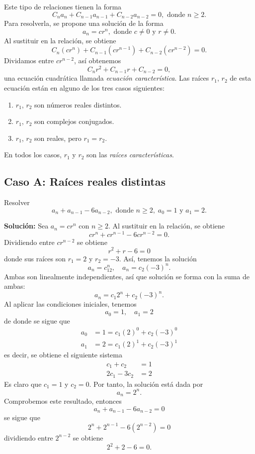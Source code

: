 Este tipo de relaciones tienen la forma
$$C_n a_n + C_{n-1} a_{n-1} + C_{n-2} a_{n-2} = 0, \text{ donde } n \geq 2.$$
Para resolverla, se propone una solución de la forma
$$a_n = cr^{n}, \text{ donde } c \neq 0 \text{ y } r \neq 0.$$
Al sustituir en la relación, se obtiene
$$C_n(cr^{n}) + C_{n-1} (cr^{n-1}) + C_{n-2} (cr^{n-2}) = 0.$$
Dividamos entre $cr^{n-2}$, así obtenemos
$$C_n r^{2} + C_{n-1} r + C_{n-2} = 0,$$
una ecuación cuadrática llamada \textit{ecuación característica}. Las raíces $r_1$, $r_2$ de esta ecuación están en alguno de los tres casos siguientes:
\begin{enumerate}[label=\alph*)]
    \item $r_1$, $r_2$ son números reales distintos.
    \item $r_1$, $r_2$ son complejos conjugados.
    \item $r_1$, $r_2$ son reales, pero $r_1 = r_2$.
\end{enumerate}
En todos los casos, $r_1$ y $r_2$ son las \textit{raíces características}.

\subsection*{Caso A: Raíces reales distintas}

\begin{myexample}
    Resolver
    $$a_n + a_{n-1} - 6a_{n-2}, \text{ donde } n \geq 2, \; a_0 = 1 \text{ y } a_1 = 2.$$
    
    \tcblower
    \textbf{\color{jblueleft}Solución:} Sea $a_n = cr^{n}$ con $n \geq 2$. Al sustituir en la relación, se obtiene
    $$cr^{n} + cr^{n-1} - 6cr^{n-2} = 0.$$
    Dividiendo entre $cr^{n-2}$ se obtiene
    $$r^{2} + r - 6 = 0$$
    donde sus raíces son $r_1 = 2$ y $r_2 = -3$. Así, tenemos la solución
    $$a_n = c_12^{n}, \quad a_n = c_2(-3)^{n}.$$
    Ambas son linealmente independientes, así que solución se forma con la suma de ambas:
    $$a_n = c_1 2^{n} + c_2 (-3)^{n}.$$
    Al aplicar las condiciones iniciales, tenemos
    $$a_0 = 1, \quad a_1 = 2$$
    de donde se sigue que
    \begin{align*}
        a_0 & = 1 = c_1(2)^{0} + c_2(-3)^{0} \\
        a_1 & = 2 = c_1(2)^{1} + c_2(-3)^{1}
    \end{align*}
    es decir, se obtiene el siguiente sistema
    \begin{align*}
        c_1 + c_2 & = 1 \\
        2c_1 - 3c_2 & = 2
    \end{align*}
    Es claro que $c_1 = 1$ y $c_2 = 0$. Por tanto, la solución está dada por
    $$a_n = 2^{n}.$$ Comprobemos este resultado, entonces
    $$a_n + a_{n-1} - 6a_{n-2} = 0$$
    se sigue que
    $$2^{n} + 2^{n-1} - 6(2^{n-2}) = 0$$
    dividiendo entre $2^{n-2}$ se obtiene
    $$2^{2} + 2 - 6 = 0.$$
\end{myexample}

